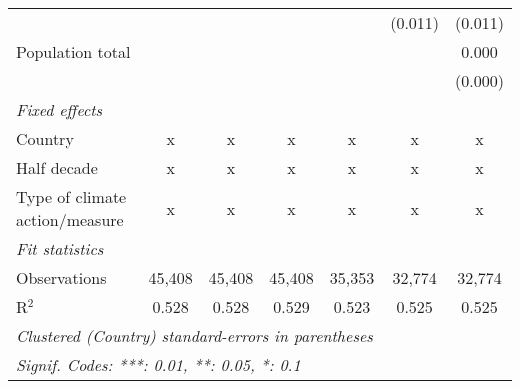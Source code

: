 \begin{tabular}{lcccccc}
                                                                                      &               &               &               &                & (0.011)        & (0.011)\\   
   Population total                                                                   &               &               &               &                &                & 0.000\\   
                                                                                      &               &               &               &                &                & (0.000)\\   
   \emph{Fixed effects}\\
   Country                                                                            & x             & x             & x             & x              & x              & x\\  
   Half decade                                                                        & x             & x             & x             & x              & x              & x\\  
   Type of climate action/measure                                                     & x             & x             & x             & x              & x              & x\\  
   \midrule \emph{Fit statistics}\\
   Observations                                                                       & 45,408        & 45,408        & 45,408        & 35,353         & 32,774         & 32,774\\  
   R$^2$                                                                              & 0.528         & 0.528         & 0.529         & 0.523          & 0.525          & 0.525\\  
   \midrule
   \multicolumn{7}{l}{\emph{Clustered (Country) standard-errors in parentheses}}\\
   \multicolumn{7}{l}{\emph{Signif. Codes: ***: 0.01, **: 0.05, *: 0.1}}\\
\end{tabular}
\par\endgroup


